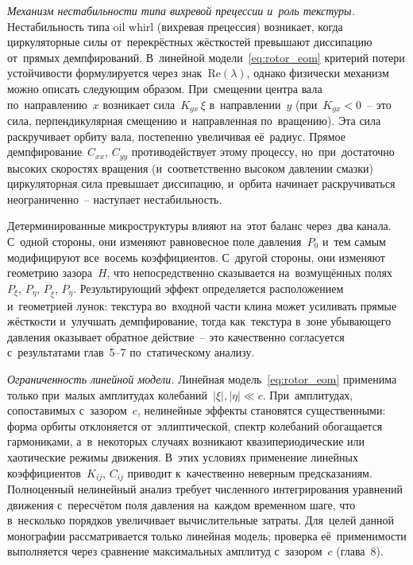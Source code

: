 \textit{Механизм нестабильности типа вихревой прецессии и~роль текстуры.}
Нестабильность типа oil whirl (вихревая прецессия) возникает, когда циркуляторные силы от~перекрёстных жёсткостей превышают диссипацию от~прямых демпфирований. В~линейной модели~\eqref{eq:rotor_eom} критерий потери устойчивости формулируется через знак~$\mathrm{Re}(\lambda)$, однако физически механизм можно описать следующим образом. При~смещении центра вала по~направлению~$x$ возникает сила~$K_{yx}\,\xi$ в~направлении~$y$ (при~$K_{yx} < 0$~-- это сила, перпендикулярная смещению и~направленная по~вращению). Эта сила раскручивает орбиту вала, постепенно увеличивая её~радиус. Прямое демпфирование~$C_{xx}$, $C_{yy}$ противодействует этому процессу, но~при~достаточно высоких скоростях вращения (и~соответственно высоком давлении смазки) циркуляторная сила превышает диссипацию, и~орбита начинает раскручиваться неограниченно~-- наступает нестабильность.

Детерминированные микроструктуры влияют на~этот баланс через~два канала. С~одной стороны, они изменяют равновесное поле давления~$P_0$ и~тем самым модифицируют все~восемь коэффициентов. С~другой стороны, они изменяют геометрию зазора~$H$, что непосредственно сказывается на~возмущённых полях~$P_\xi$, $P_\eta$, $P_{\dot\xi}$, $P_{\dot\eta}$. Результирующий эффект определяется расположением и~геометрией лунок: текстура во~входной части клина может усиливать прямые жёсткости и~улучшать демпфирование, тогда как~текстура в~зоне убывающего давления оказывает обратное действие~-- это качественно согласуется с~результатами глав~5--7 по~статическому анализу.

\textit{Ограниченность линейной модели.}
Линейная модель~\eqref{eq:rotor_eom} применима только при~малых амплитудах колебаний~$|\xi|, |\eta| \ll c$. При~амплитудах, сопоставимых с~зазором~$c$, нелинейные эффекты становятся существенными: форма орбиты отклоняется от~эллиптической, спектр колебаний обогащается гармониками, а~в~некоторых случаях возникают квазипериодические или хаотические режимы движения. В~этих условиях применение линейных коэффициентов~$K_{ij}$, $C_{ij}$ приводит к~качественно неверным предсказаниям. Полноценный нелинейный анализ требует численного интегрирования уравнений движения с~пересчётом поля давления на~каждом временном шаге, что в~несколько порядков увеличивает вычислительные затраты. Для~целей данной монографии рассматривается только линейная модель; проверка её~применимости выполняется через сравнение максимальных амплитуд с~зазором~$c$ (глава~8).

